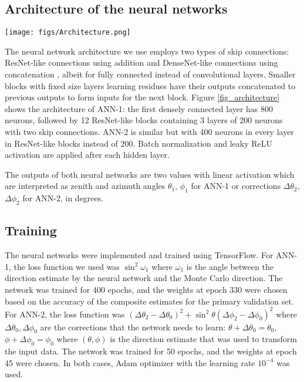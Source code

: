 \documentclass[reprint,
superscriptaddress,
amsmath,amssymb,aps,showkeys,showpacs,
twoside,final,secnumarabic,%
nofootinbib]{revtex4-2}
\begin{document}
\subsection{Architecture of the neural networks}
\begin{figure*}[h]
\texttt{[image: figs/Architecture.png]}
\caption{\label{fig_architecture} The architecute of the first stage neural network.}
\end{figure*}

The neural network architecture we use employs two types of skip connections: ResNet-like connections using addition and DenseNet-like connections using concatenation \cite{He16a, Huang17}, albeit for fully connected instead of convolutional layers. Smaller blocks with fixed size layers learning residues have their outputs concatenated to previous outputs to form inputs for the next block. Figure \ref{fig_architecture} shows the architecture of ANN-1: the first densely connected layer has 800 neurons, followed by 12 ResNet-like blocks containing 3 layers of 200 neurons with two skip connections. ANN-2 is similar but with 400 neurons in every layer in ResNet-like blocks instead of 200. 
Batch normalization and leaky ReLU activation are applied after each hidden layer. 

The outputs of both neural networks are two values with linear activation which are interpreted as zenith and azimuth angles $\theta_1$, $\phi_1$ for ANN-1 or corrections $\Delta\theta_2$, $\Delta\phi_2$ for ANN-2, in degrees.

\subsection{Training}

The neural networks were implemented and trained using TensorFlow. 
For ANN-1, the loss function we used was $\sin^2 \omega_1$ where $\omega_1$ is the angle between the direction estimate by the neural network and the Monte Carlo direction. The network was trained for 400 epochs, and the weights at epoch 330 were chosen based on the accuracy of the composite estimates for the primary validation set.
For ANN-2, the loss function was $(\Delta\theta_2 - \Delta\theta_0)^2 + \sin^2 \theta (\Delta\phi_2 - \Delta\phi_0)^2$ where $\Delta\theta_0, \Delta\phi_0$ are the corrections that the network needs to learn: $\theta + \Delta\theta_0 = \theta_0$, $\phi + \Delta\phi_0 = \phi_0$ where $(\theta, \phi)$ is the direction estimate that was used to transform the input data. The network was trained for 50 epochs, and the weights at epoch 45 were chosen.
In both cases, Adam optimizer \cite{Kingma14} with the learning rate $10^{-4}$ was used.
\end{document}
